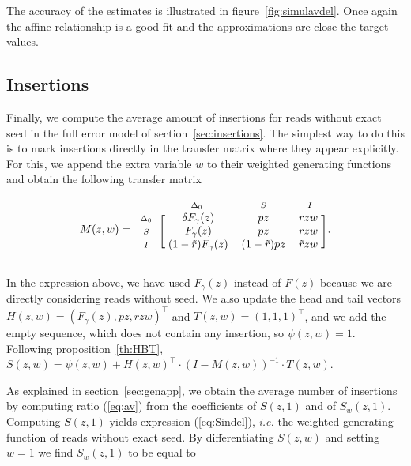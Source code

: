 \documentclass{article}
\newcommand{\smI}{\scriptstyle{I}}
\newcommand{\smS}{\scriptstyle{S}}
\newcommand{\smDELz}{\scriptstyle{\Delta_0}}
\begin{document}
The accuracy of the estimates is illustrated in
figure~\ref{fig:simulavdel}. Once again the affine relationship is a good
fit and the approximations are close the target values.





\subsection{Insertions}
\label{sec:avins}

Finally, we compute the average amount of insertions for reads without
exact seed in the full error model of section~\ref{sec:insertions}. The
simplest way to do this is to mark insertions directly in the transfer
matrix where they appear explicitly. For this, we append the extra
variable $w$ to their weighted generating functions and obtain the
following transfer matrix

\begin{equation*}
M(z,w) = 
\begin{blockarray}{cccc}
       & \smDELz & \smS & \smI \\
\begin{block}{c[ccc]}
\smDELz & \; \delta F_\gamma(z) & pz & rzw \; \\
\smS    & \;        F_\gamma(z) & pz & rzw \; \\
\smI    & \; (1-\tilde{r})F_\gamma(z)
           & (1-\tilde{r})pz & \tilde{r}zw \; \\
\end{block}
\end{blockarray}.
\end{equation*}

In the expression above, we have used $F_\gamma(z)$ instead of $F(z)$
because we are directly considering reads without seed. We also update the
head and tail vectors $H(z,w) = (F_\gamma(z), pz, rzw)^\top$ and
$T(z,w)=(1,1,1)^\top$, and we add the empty sequence, which does not
contain any insertion, so $\psi(z,w) = 1$. Following
proposition~\ref{th:HBT}, $S(z,w) = \psi(z,w) + H(z,w)^\top \cdot
(I-M(z,w))^{-1} \cdot T(z,w)$.

As explained in section~\ref{sec:genapp}, we obtain the average number of
insertions by computing ratio (\ref{eq:av}) from the coefficients of
$S(z,1)$ and of $S_w(z,1)$. Computing $S(z,1)$ yields expression
(\ref{eq:Sindel}), \textit{i.e.} the weighted generating function of reads
without exact seed. By differentiating $S(z,w)$ and setting $w=1$ we find
$S_w(z,1)$ to be equal to
\end{document}
